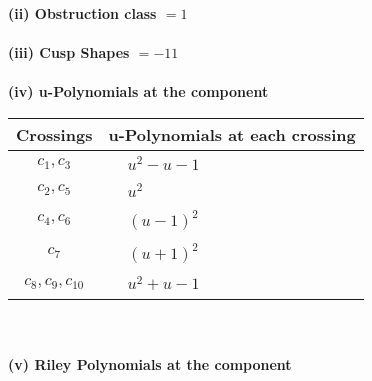 \documentclass[1p]{elsarticle_modified}
\theoremstyle{definition}
\begin{document}
\flushleft \textbf{(ii) Obstruction class $= 1$}\\~\\
\flushleft \textbf{(iii) Cusp Shapes $= -11$}\\~\\
\newpage\renewcommand{\arraystretch}{1}
\flushleft \textbf{(iv) u-Polynomials at the component}\newline \\
\begin{tabular}{m{50pt}|m{274pt}}
Crossings & \hspace{64pt}u-Polynomials at each crossing \\
\hline $$\begin{aligned}c_{1},c_{3}\end{aligned}$$&$\begin{aligned}
&u^2- u-1
\end{aligned}$\\
\hline $$\begin{aligned}c_{2},c_{5}\end{aligned}$$&$\begin{aligned}
&u^2
\end{aligned}$\\
\hline $$\begin{aligned}c_{4},c_{6}\end{aligned}$$&$\begin{aligned}
&(u-1)^2
\end{aligned}$\\
\hline $$\begin{aligned}c_{7}\end{aligned}$$&$\begin{aligned}
&(u+1)^2
\end{aligned}$\\
\hline $$\begin{aligned}c_{8},c_{9},c_{10}\end{aligned}$$&$\begin{aligned}
&u^2+u-1
\end{aligned}$\\
\hline
\end{tabular}\\~\\
\newpage\renewcommand{\arraystretch}{1}
\flushleft \textbf{(v) Riley Polynomials at the component}\newline \\
\end{document}
